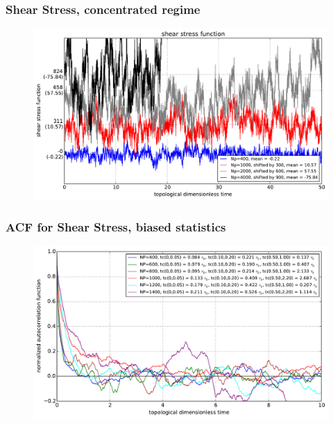 \documentclass[slidestop, compress, mathserif]{beamer}
\begin{document}
\begin{frame}
  \frametitle<presentation>{Shear Stress, concentrated regime}
  \begin{figure}
    \centering
    \includegraphics[width=\textwidth]{../shear_stress_function_over.pdf}
  \end{figure}
\end{frame}

\begin{frame}
  \frametitle<presentation>{ACF for Shear Stress, biased statistics}
  \begin{figure}
    \centering
    \includegraphics[width=\textwidth]{../check_ACF_NP.pdf}
  \end{figure}
\end{frame}
\end{document}

